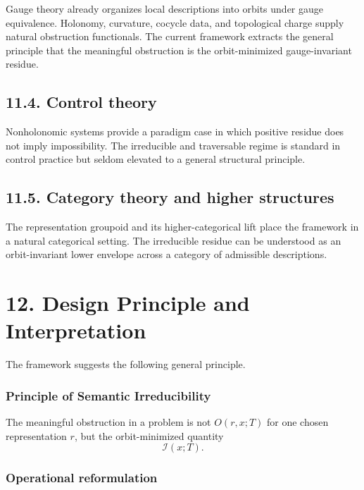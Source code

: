 \documentclass[
]{article}
\begin{document}
Gauge theory already organizes local descriptions into orbits under
gauge equivalence. Holonomy, curvature, cocycle data, and topological
charge supply natural obstruction functionals. The current framework
extracts the general principle that the meaningful obstruction is the
orbit-minimized gauge-invariant residue.

\subsection{11.4. Control theory}\label{control-theory}

Nonholonomic systems provide a paradigm case in which positive residue
does not imply impossibility. The irreducible and traversable regime is
standard in control practice but seldom elevated to a general structural
principle.

\subsection{11.5. Category theory and higher
structures}\label{category-theory-and-higher-structures}

The representation groupoid and its higher-categorical lift place the
framework in a natural categorical setting. The irreducible residue can
be understood as an orbit-invariant lower envelope across a category of
admissible descriptions.

\section{12. Design Principle and
Interpretation}\label{design-principle-and-interpretation}

The framework suggests the following general principle.

\subsubsection{Principle of Semantic
Irreducibility}\label{principle-of-semantic-irreducibility}

The meaningful obstruction in a problem is not \(O(r,x;T)\) for one
chosen representation \(r\), but the orbit-minimized quantity \[
\mathcal{I}(x;T).
\]

\subsubsection{Operational
reformulation}\label{operational-reformulation}
\end{document}
